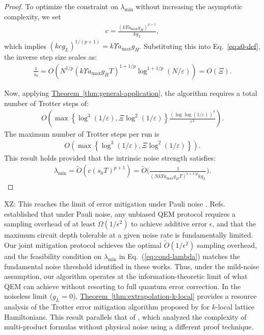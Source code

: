 \documentclass[aps,pra,reprint,groupedaddress,floatfix]{revtex4-2}
\newcommand{\thm}[1]{\hyperref[thm:#1]{Theorem~\ref*{thm:#1}}}
\newcommand{\eps}{\varepsilon}
\newcommand{\xz}[1]{{\color{cyan} XZ: #1}}
\begin{document}
\begin{proof}
    To optimize the constraint on $\lambda_{\min}$ without increasing the asymptotic complexity, we set
    \begin{align}
    \label{eq:def-c}
        c = \frac{(k\Upsilon a_{\max}g_H)^{p+1}}{kg_L},
    \end{align}
    which implies $(kcg_L)^{1/(p+1)} = k\Upsilon a_{\max}g_H$. Substituting this into Eq.~\eqref{eq:s0-def}, the inverse step size scales as:
    \begin{align*}
        \frac{1}{s_0} = O\left( N^{1/p}(k\Upsilon a_{\max} g_H T)^{1+1/p} \log^{1+1/p}(N/\eps) \right) = O(\Xi).
    \end{align*}

    Now, applying \thm{general-application}, the algorithm requires a total number of Trotter steps of:
    \begin{align*}
         O\left( \max\left\{\log^3(1/\eps), \Xi \log^2(1/\eps)\right\} \frac{(\log\log (1/\eps))^3}{\eps^2} \right).
    \end{align*}
    The maximum number of Trotter steps per run is
    \begin{align*}
  O\left( \max\left\{\log^3(1/\eps), \Xi \log^2(1/\eps)\right\} \right).
    \end{align*}
    This result holds provided that the intrinsic noise strength satisfies:
    \begin{align*}
        \lambda_{\min} = \widetilde{O}(c(s_0T)^{p+1}) = \widetilde{O}\Big(\frac{1}{ (Nk\Upsilon a_{\max}g_HT)^{1+1/p} kg_L }\Big).
    \end{align*}
\end{proof}
\xz{This reaches the limit of error mitigation under Pauli noise \cite{wang2021noise, cai2021multi}.}
Refs.~\cite{wang2021noise, cai2021multi} established that under Pauli noise, any unbiased QEM protocol requires a sampling overhead of at least $\Omega(1/\epsilon^2)$ to achieve additive error $\epsilon$, and that the maximum circuit depth tolerable at a given noise rate is fundamentally limited. Our joint mitigation protocol achieves the optimal $\widetilde{O}(1/\epsilon^2)$ sampling overhead, and the feasibility condition on $\lambda_{\min}$ in Eq.~(\ref{eq:cond-lambda}) matches the fundamental noise threshold identified in these works. Thus, under the mild-noise assumption, our algorithm operates at the information-theoretic limit of what QEM can achieve without resorting to full quantum error correction.
In the noiseless limit ($g_L = 0$), \thm{extrapolation-k-local} provides a resource analysis of the Trotter error mitigation algorithm proposed by \citet{watson2025exponentially} for $k$-local lattice Hamiltonians. This result parallels that of \citet{mizuta2025commutator}, which analyzed the complexity of multi-product formulas without physical noise using a different proof technique.
\end{document}
